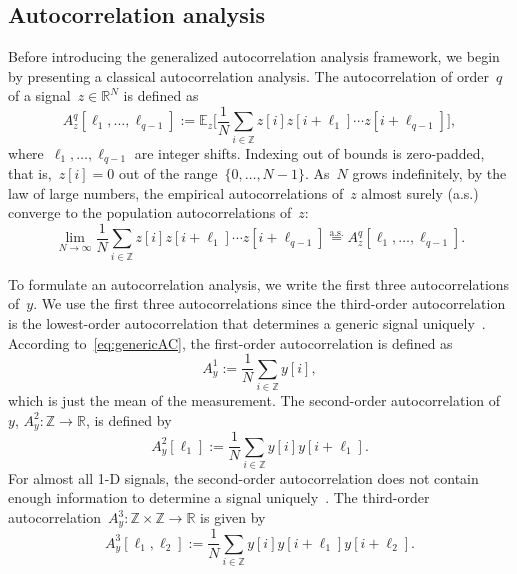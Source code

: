 \documentclass{article}
\begin{document}
\subsection{Autocorrelation analysis}
\label{subsec:ac}
{Before introducing the generalized autocorrelation analysis framework, we begin by presenting a classical autocorrelation analysis}. The autocorrelation of order~$q$ of a signal~\mbox{$z \in \mathbb{R}^{N}$} is defined as
\begin{equation*}
A_z^q[\ell_1, \ldots, \ell_{q-1}] := \mathbb{E}_z\Big[\frac{1}{N} \sum_{i \in \mathbb{Z}} z[i] z[i + \ell_1] \cdots z[i + \ell_{q-1}]\Big],
\end{equation*}
where~$\ell_1, \ldots, \ell_{q-1}$ are integer shifts. Indexing out of bounds is zero-padded, that is,~\mbox{$z[i] = 0$} out of the range~\mbox{$\{0, \ldots, {N-1}\}$}. As~$N$ grows indefinitely, by the law of large numbers, the empirical autocorrelations of~$z$ almost surely (a.s.) converge to the population autocorrelations of~$z$:
\begin{equation}\label{eq:genericAC}
\lim_{N \rightarrow \infty} \frac{1}{N} \sum_{i \in \mathbb{Z}} z[i] z[i + \ell_1] \cdots z[i + \ell_{q-1}] \stackrel{\text{a.s.}}{=}A_z^q[\ell_1, \ldots, \ell_{q-1}].
\end{equation}

To formulate an autocorrelation analysis, we write the first three autocorrelations of~$y$. {We use the first three autocorrelations since the third-order autocorrelation is the lowest-order autocorrelation that determines a generic signal uniquely~\cite{bendory2019multi}}. According to~\eqref{eq:genericAC}, the first-order autocorrelation is defined as
\begin{equation*}
A_{y}^1 := \frac{1}{N} \sum_{i \in \mathbb{Z}} y[i],
\end{equation*}
which is just the mean of the measurement. The second-order autocorrelation of~$y$, \mbox{$A_{y}^2: \mathbb{Z} \rightarrow \mathbb{R}$}, is defined by
\begin{equation*}
A_{y}^2 [\ell_1] := \frac{1}{N} \sum_{i \in \mathbb{Z}} y[i] y[i + \ell_1].
\end{equation*}
{For almost all \mbox{1-D} signals, the second-order autocorrelation does not contain enough information to determine a signal uniquely~\cite{beinert2018enforcing,bendory2017fourier}}. The third-order autocorrelation~\mbox{$A_{y}^3: \mathbb{Z} \times \mathbb{Z} \rightarrow \mathbb{R}$} {is given} by
\begin{equation*}
A_{y}^3 [\ell_1, \ell_2] := \frac{1}{N} \sum_{i \in \mathbb{Z}} y[i] y[i + \ell_1] y[i + \ell_2].
\end{equation*}
\end{document}
